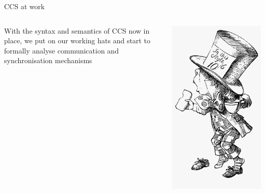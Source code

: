 \documentclass{beamer}
\begin{document}
\begin{frame}{CCS at work}
  \begin{minipage}[0.3\textheight]{\textwidth}
  \begin{columns}[c]
  \begin{column}{0.62\textwidth}
    With the syntax and semantics of CCS now in place, we put on
    our working hats and start to \alert{formally} analyse
    communication and synchronisation mechanisms
  \end{column}
  \begin{column}{0.28\textwidth}
    \includegraphics[scale=0.1]{images/mad-hatter.png}
  \end{column}
  \end{columns}
  \end{minipage}
\end{frame}
\end{document}
